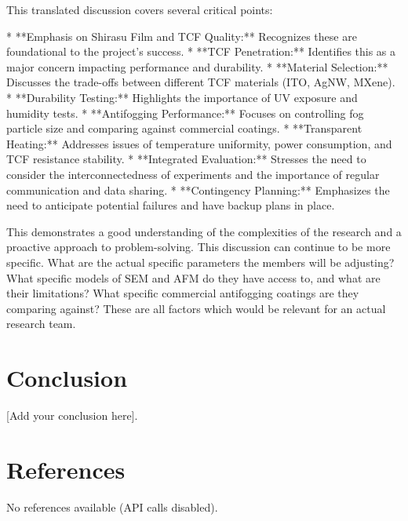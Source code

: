 \documentclass{article}
\begin{document}
This translated discussion covers several critical points:

*   **Emphasis on Shirasu Film and TCF Quality:**  Recognizes these are foundational to the project's success.
*   **TCF Penetration:** Identifies this as a major concern impacting performance and durability.
*   **Material Selection:** Discusses the trade-offs between different TCF materials (ITO, AgNW, MXene).
*   **Durability Testing:**  Highlights the importance of UV exposure and humidity tests.
*   **Antifogging Performance:**  Focuses on controlling fog particle size and comparing against commercial coatings.
*   **Transparent Heating:** Addresses issues of temperature uniformity, power consumption, and TCF resistance stability.
*   **Integrated Evaluation:** Stresses the need to consider the interconnectedness of experiments and the importance of regular communication and data sharing.
*   **Contingency Planning:** Emphasizes the need to anticipate potential failures and have backup plans in place.

This demonstrates a good understanding of the complexities of the research and a proactive approach to problem-solving. This discussion can continue to be more specific. What are the actual specific parameters the members will be adjusting? What specific models of SEM and AFM do they have access to, and what are their limitations? What specific commercial antifogging coatings are they comparing against? These are all factors which would be relevant for an actual research team.


\section{Conclusion}
[Add your conclusion here].

\section{References}
No references available (API calls disabled).
\end{document}
